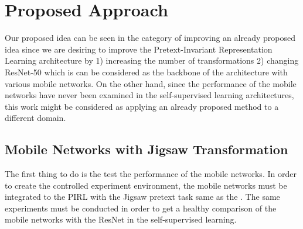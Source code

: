 \documentclass[conference]{IEEEtran}
\begin{document}
\begin{table}
    \caption{
        \textbf{EfficientNet Performance Results on ImageNet \cite{efficientnet}} 
       }
  \vskip 0.1in
    \centering
    \label{tab:imagenet}
\end{table}



\section{Proposed Approach}
Our proposed idea can be seen in the category of improving an already proposed idea since we are desiring to improve the Pretext-Invariant Representation Learning architecture by 1) increasing the number of transformations 2) changing ResNet-50 which is can be considered as the backbone of the architecture with various mobile networks. On the other hand, since the performance of the mobile networks have never been examined in the self-supervised learning architectures, this work might be considered as applying an already proposed method to a different domain.  

\subsection{Mobile Networks with Jigsaw Transformation}\label{AA}
The first thing to do is the test the performance of the mobile networks. In order to create the controlled experiment environment, the mobile networks must be integrated to the PIRL with the Jigsaw pretext task same as the \cite{PIRL}. The same experiments must be conducted in order to get a healthy comparison of the mobile networks with the ResNet \cite{resnet} in the self-supervised learning.
\end{document}
